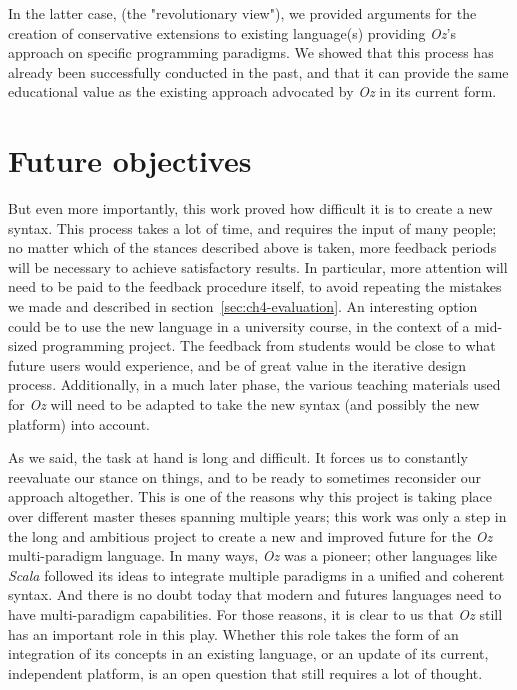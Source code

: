 In the latter case, (the "revolutionary view"), we provided arguments for the creation of conservative extensions to existing language(s) providing \textit{Oz}'s approach on specific programming paradigms.
We showed that this process has already been successfully conducted in the past, and that it can provide the same educational value as the existing approach advocated by \textit{Oz} in its current form.

\section{Future objectives}\label{sec:ch5-future-objectives}
But even more importantly, this work proved how difficult it is to create a new syntax.
This process takes a lot of time, and requires the input of many people;
no matter which of the stances described above is taken, more feedback periods will be necessary to achieve satisfactory results.
In particular, more attention will need to be paid to the feedback procedure itself, to avoid repeating the mistakes we made and described in section~\ref{sec:ch4-evaluation}.
An interesting option could be to use the new language in a university course, in the context of a mid-sized programming project.
The feedback from students would be close to what future users would experience, and be of great value in the iterative design process.
Additionally, in a much later phase, the various teaching materials used for \textit{Oz} will need to be adapted to take the new syntax (and possibly the new platform) into account.\newline

As we said, the task at hand is long and difficult.
It forces us to constantly reevaluate our stance on things, and to be ready to sometimes reconsider our approach altogether.
This is one of the reasons why this project is taking place over different master theses spanning multiple years;
this work was only a step in the long and ambitious project to create a new and improved future for the \textit{Oz} multi-paradigm language.
In many ways, \textit{Oz} was a pioneer;
other languages like \textit{Scala} followed its ideas to integrate multiple paradigms in a unified and coherent syntax.
And there is no doubt today that modern and futures languages need to have multi-paradigm capabilities.
For those reasons, it is clear to us that \textit{Oz} still has an important role in this play.
Whether this role takes the form of an integration of its concepts in an existing language, or an update of its current, independent platform, is an open question that still requires a lot of thought.